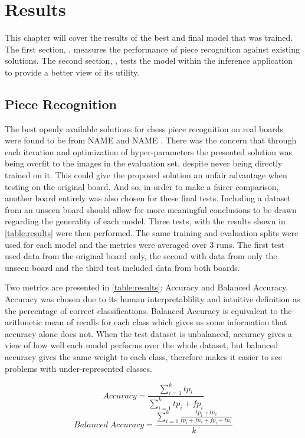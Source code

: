 \chapter{Results}
\label{results}

This chapter will cover the results of the best and final model that was trained.  The first section, , measures the performance
of piece recognition against existing solutions.  The second section, , tests the model within the inference application
to provide a better view of its utility.

\section{Piece Recognition}
\label{evaluation}

The best openly available solutions for chess piece recognition on real boards were found to be from NAME \cite{} and NAME \cite{}.
There was the concern that through each iteration and optimization of hyper-parameters the presented solution was being overfit to the 
images in the evaluation set, despite never being directly trained on it.  This could give the proposed solution an unfair advantage when testing on the original board.
And so, in order to make a fairer comparison, another board entirely was also chosen for these final tests.  
Including a dataset from an unseen board should allow for more meaningful conclusions to be drawn regarding the generality of each model.
Three tests, with the results shown in \autoref{table:results} were then performed.  The same training and evaluation splits were used for each model and 
the metrics were averaged over 3 runs.  The first test used data from the original board only, the second with data from only the unseen board and the 
third test included data from both boards.

Two metrics are presented in \ref{table:results}: Accuracy and Balanced Accuracy.  Accuracy was chosen due to its human
interpretablility and intuitive definition as the percentage of correct classifications.  Balanced Accuracy is equivalent to the arithmetic mean of recalls 
for each class which gives us some information that accuracy alone does not.  When the test dataset is unbalanced, accuracy gives a view of 
how well each model performs over the whole dataset, but balanced accuracy gives the same weight to each class, therefore makes it easier to see problems 
with under-represented classes.

\begin{equation}
    Accuracy = \frac{ \sum_{i=1}^{k}{tp_i} }{ \sum_{i=1}^{k}{tp_i + fp_i} }
\end{equation}
\begin{equation}
    Balanced\;Accuracy = \frac{\sum_{i=1}^{k}{ \frac{tp_i+tn_i}{tp_i+fn_i+fp_i+tn_i}} }{k}
\end{equation}

